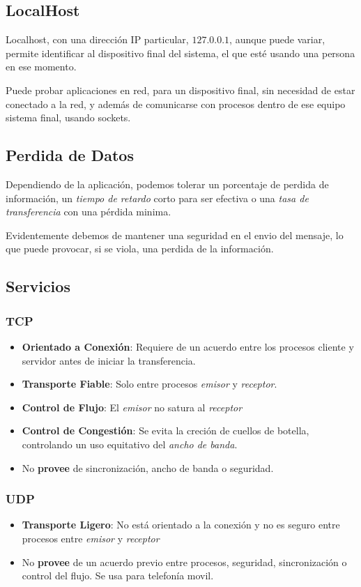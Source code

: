 \subsection{LocalHost}
\noindent Localhost, con una dirección IP particular, \(127.0.0.1\), aunque puede variar, permite identificar al dispositivo final del sistema, el que esté usando una persona en ese momento.\par \noindent Puede probar aplicaciones en red, para un dispositivo final, sin necesidad de estar conectado a la red, y además de comunicarse con procesos dentro de ese equipo sistema final, usando sockets.
\subsection{Perdida de Datos}
\noindent Dependiendo de la aplicación, podemos tolerar un porcentaje de perdida de información, un \textit{tiempo de retardo} corto para ser efectiva o una \textit{tasa de transferencia} con una pérdida minima.
\par \noindent Evidentemente debemos de mantener una seguridad en el envio del mensaje, lo que puede provocar, si se viola, una perdida de la información.
\subsection{Servicios}
\subsubsection{TCP}
\begin{itemize}
        \item \textbf{Orientado a Conexión}: Requiere de un acuerdo entre los procesos cliente y servidor antes de iniciar la transferencia.
        \item \textbf{Transporte Fiable}: Solo entre procesos \textit{emisor} y \textit{receptor}.
        \item \textbf{Control de Flujo}: El \textit{emisor} no satura al \textit{receptor}
        \item \textbf{Control de Congestión}: Se evita la creción de cuellos de botella, controlando un uso equitativo del \textit{ancho de banda}.
        \item No \textbf{provee} de sincronización, ancho de banda o seguridad.
\end{itemize}
\subsubsection{UDP}
\begin{itemize}
        \item \textbf{Transporte Ligero}: No está orientado a la conexión y no es seguro entre procesos entre \textit{emisor} y \textit{receptor}
        \item No \textbf{provee} de un acuerdo previo entre procesos, seguridad, sincronización o control del flujo. Se usa para telefonía movil.
\end{itemize}
